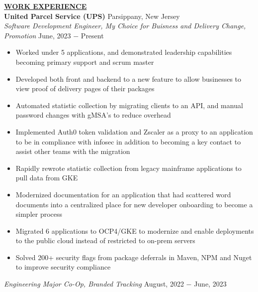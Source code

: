 \documentclass{article}
\begin{document}
% 
%
\noindent \textbf{\underline{WORK EXPERIENCE}} \\
\noindent \textbf{United Parcel Service (UPS)} \hfill Parsippany, New Jersey \\
\textit{Software Development Engineer, My Choice for Buisness and Delivery Change, Promotion} \hfill June, 2023 $-$ Present
\begin{itemize}[noitemsep,nolistsep,leftmargin=*]
\item {Worked under 5 applications, and demonstrated leadership capabilities becoming primary support and scrum master}
\item {Developed both front and backend to a new feature to allow businesses to view proof of delivery pages of their packages }
\item {Automated statistic collection by migrating clients to an API, and manual password changes with gMSA's to reduce overhead}
\item {Implemented Auth0 token validation and Zscaler as a proxy to an application to be in compliance with infosec in addition to becoming a key contact to assist other teams with the migration}
\item {Rapidly rewrote statistic collection from legacy mainframe applications to pull data from GKE}
\item {Modernized documentation for an application that had scattered word documents into a centralized place for new developer onboarding to become a simpler process}
\item {Migrated 6 applications to OCP4/GKE to modernize and enable deployments to the public cloud instead of restricted to on-prem servers}
\item {Solved 200+ security flags from package deferrals in Maven, NPM and Nuget to improve security compliance}\\

\end{itemize}\textit{Engineering Major Co-Op, Branded Tracking} \hfill August, 2022 $-$ June, 2023
\end{document}
